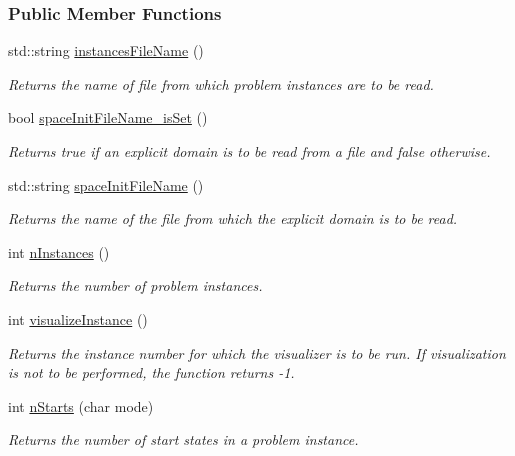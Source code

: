 \subsubsection*{Public Member Functions}
\begin{DoxyCompactItemize}
\item 
std\+::string \hyperlink{structcommandLine_1_1CommandLine_aa3e5dc17525a6028db5b5f349bca866e}{instances\+File\+Name} ()
\begin{DoxyCompactList}\small\item\em Returns the name of file from which problem instances are to be read. \end{DoxyCompactList}\item 
bool \hyperlink{structcommandLine_1_1CommandLine_a9aa10cf1a00aa54c3c19909cfb3344c1}{space\+Init\+File\+Name\+\_\+is\+Set} ()
\begin{DoxyCompactList}\small\item\em Returns {\ttfamily true} if an explicit domain is to be read from a file and {\ttfamily false} otherwise. \end{DoxyCompactList}\item 
std\+::string \hyperlink{structcommandLine_1_1CommandLine_aa846ec1ae954353cdb6a435125dba8c7}{space\+Init\+File\+Name} ()
\begin{DoxyCompactList}\small\item\em Returns the name of the file from which the explicit domain is to be read. \end{DoxyCompactList}\item 
int \hyperlink{structcommandLine_1_1CommandLine_a04dd5632a853caf8b2313406ef0f24ce}{n\+Instances} ()
\begin{DoxyCompactList}\small\item\em Returns the number of problem instances. \end{DoxyCompactList}\item 
int \hyperlink{structcommandLine_1_1CommandLine_a0783bd3cc612ff67b0de642612b9f9e0}{visualize\+Instance} ()
\begin{DoxyCompactList}\small\item\em Returns the instance number for which the visualizer is to be run. If visualization is not to be performed, the function returns -\/1. \end{DoxyCompactList}\item 
int \hyperlink{structcommandLine_1_1CommandLine_a80dee1f0cf850c02ce566bc962386958}{n\+Starts} (char mode)
\begin{DoxyCompactList}\small\item\em Returns the number of start states in a problem instance. \end{DoxyCompactList}\item 

\end{DoxyCompactItemize}
